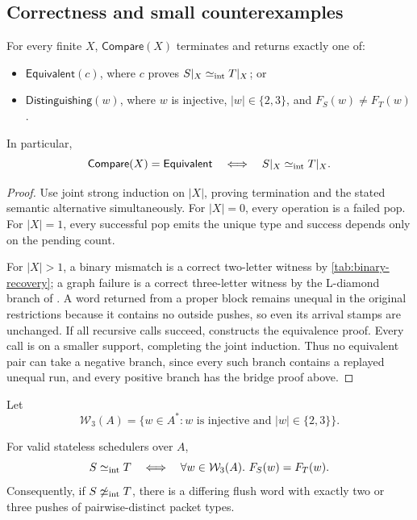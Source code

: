 \subsection{Correctness and small counterexamples}

\begin{theorem}
\label{thm:eta-comparison}
For every finite \(X\), \(\mathsf{Compare}(X)\) terminates and returns exactly
one of:
\begin{itemize}
\item \(\mathsf{Equivalent}(c)\), where \(c\) proves
      \(S|_X\mathrel{\simeq_{\mathrm{int}}} T|_X\); or
\item \(\mathsf{Distinguishing}(w)\), where \(w\) is injective,
      \(|w|\in\{2,3\}\), and \(F_S(w)\ne F_T(w)\).
\end{itemize}
In particular,
\begin{equation}
 \mathsf{Compare}(X)=\mathsf{Equivalent}
 \quad\Longleftrightarrow\quad
 S|_X\mathrel{\simeq_{\mathrm{int}}} T|_X.
 \label{eq:eta-comparison-correct}
\end{equation}
\end{theorem}

\begin{proof}
Use joint strong induction on \(|X|\), proving termination and the stated
semantic alternative simultaneously.  For \(|X|=0\), every operation is a
failed pop.  For \(|X|=1\), every successful pop emits the unique type and
success depends only on the pending count.

For \(|X|>1\), a binary mismatch is a correct two-letter witness by
\autoref{tab:binary-recovery}; a graph failure is a correct three-letter witness
by the L-diamond branch of .  A word returned
from a proper block remains unequal in the original restrictions because it
contains no outside pushes, so even its arrival stamps are unchanged.  If all
recursive calls succeed,  constructs the
equivalence proof.  Every call is on a smaller support, completing the joint
induction.  Thus no equivalent pair can take a negative branch, since every
such branch contains a replayed unequal run, and every positive branch has the
bridge proof above.
\end{proof}

Let
\begin{equation}
 \mathcal W_3(A)=
 \{w\in A^*:w\text{ is injective and }|w|\in\{2,3\}\}.
 \label{eq:eta-W3}
\end{equation}

\begin{corollary}
\label{cor:eta-small-counterexample}
For valid stateless schedulers over \(A\),
\begin{equation}
 S\mathrel{\simeq_{\mathrm{int}}} T
 \quad\Longleftrightarrow\quad
 \forall w\in\mathcal W_3(A).\ F_S(w)=F_T(w).
 \label{eq:eta-finite-observation}
\end{equation}
Consequently, if \(S\not\mathrel{\simeq_{\mathrm{int}}} T\), there is a differing flush word with
exactly two or three pushes of pairwise-distinct packet types.
\end{corollary}

